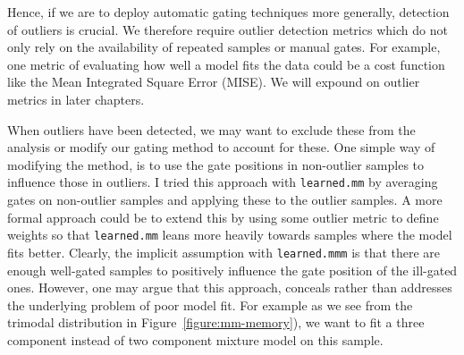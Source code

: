 Hence, if we are to deploy automatic gating techniques more generally, detection of outliers is crucial.
We therefore require outlier detection metrics which do not only rely on the availability of repeated samples or manual gates.
For example, one metric of evaluating how well a model fits the data could be a cost function like the Mean Integrated Square Error (MISE).
We will expound on outlier metrics in later chapters.

When outliers have been detected, we may want to exclude these from the analysis or modify our gating method to account for these.
One simple way of modifying the method, is to use the gate positions in non-outlier samples to influence those in outliers.
I tried this approach with \texttt{learned.mm} by averaging gates on non-outlier samples and applying these to the outlier samples.
A more formal approach could be to extend this by using some outlier metric to define weights so that \texttt{learned.mm} leans more heavily
towards samples where the model fits better.
Clearly, the implicit assumption with \texttt{learned.mmm} is that there are enough well-gated samples to positively influence the gate position of the ill-gated ones.
However, one may argue that this approach, conceals rather than addresses the underlying problem of poor model fit.
For example as we see from the trimodal distribution in Figure~\ref{figure:mm-memory}), we want to fit a three component instead of two component mixture model on this sample.


